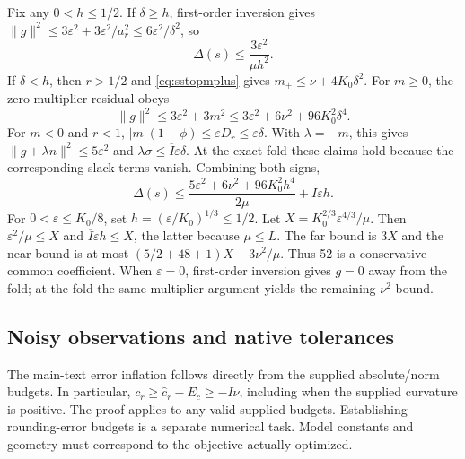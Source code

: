 Fix any $0<h\le1/2$. If $\delta\ge h$, first-order inversion gives $\|g\|^2\le3\varepsilon^2+3\varepsilon^2/a_r^2\le6\varepsilon^2/\delta^2$, so
\begin{equation}
 \Delta(s)\le\frac{3\varepsilon^2}{\mu h^2}.
 \label{eq:sstopfar}
\end{equation}
If $\delta<h$, then $r>1/2$ and \eqref{eq:sstopmplus} gives $m_+\le\nu+4K_0\delta^2$. For $m\ge0$, the zero-multiplier residual obeys
\begin{equation}
 \|g\|^2\le3\varepsilon^2+3m^2
 \le3\varepsilon^2+6\nu^2+96K_0^2\delta^4.
 \label{eq:sstoppositive}
\end{equation}
For $m<0$ and $r<1$, $|m|(1-\phi)\le\varepsilon D_r\le\varepsilon\delta$. With $\lambda=-m$, this gives $\|g+\lambda n\|^2\le5\varepsilon^2$ and $\lambda\sigma\le\overline I\varepsilon\delta$. At the exact fold these claims hold because the corresponding slack terms vanish. Combining both signs,
\begin{equation}
 \Delta(s)\le\frac{5\varepsilon^2+6\nu^2+96K_0^2h^4}{2\mu}
                   +\overline I\varepsilon h.
 \label{eq:sstopnear}
\end{equation}
For $0<\varepsilon\le K_0/8$, set $h=(\varepsilon/K_0)^{1/3}\le1/2$. Let $X=K_0^{2/3}\varepsilon^{4/3}/\mu$. Then $\varepsilon^2/\mu\le X$ and $\overline I\varepsilon h\le X$, the latter because $\mu\le L$. The far bound is $3X$ and the near bound is at most $(5/2+48+1)X+3\nu^2/\mu$. Thus 52 is a conservative common coefficient. When $\varepsilon=0$, first-order inversion gives $g=0$ away from the fold; at the fold the same multiplier argument yields the remaining $\nu^2$ bound.

\subsection{Noisy observations and native tolerances}
The main-text error inflation follows directly from the supplied absolute/norm budgets. In particular, $c_r\ge\widehat c_r-E_c\ge-I\nu$, including when the supplied curvature is positive. The proof applies to any valid supplied budgets. Establishing rounding-error budgets is a separate numerical task. Model constants and geometry must correspond to the objective actually optimized.


